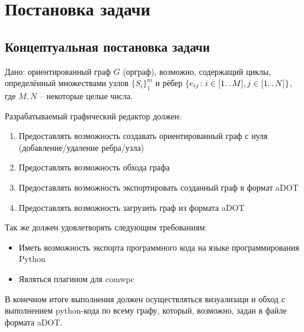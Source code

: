 \chapter{Постановка задачи}
\section{Концептуальная постановка задачи}
Дано: ориентированный граф $G$ (орграф), возможно, содержащий циклы, определённый множествами узлов $\{S_i\}_1^m$ и рёбер $\{e_{ij}\colon i\in[1\ldotp\ldotp M], j\in[1\ldotp\ldotp N]\}$, где $M,N$ -- некоторые целые числа.

Разрабатываемый графический редактор должен:
\begin{enumerate}
\item  Предоставлять возможность создавать ориентированный граф с нуля (добавление/удаление ребра/узла)
\item Предоставлять возможность обхода графа
\item Предоставлять возможность экспортировать созданный граф в формат aDOT
\item Предоставлять возможность загрузить граф из формата aDOT
\end{enumerate}

Так же должен удовлетворять следующим требованиям:
\begin{itemize}
\item Иметь возможность экспорта программного кода на языке программирования Python
\item Являться плагином для comwpc
\end{itemize}

В конечном итоге выполнения должен осуществляться визуализаци и обход с выполнением python-кода по всему графу, который, возможно, задан в файле формата aDOT. 
